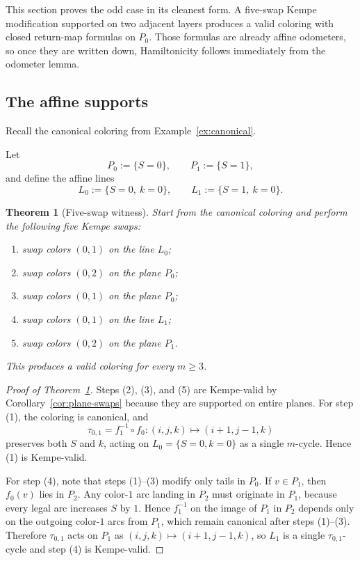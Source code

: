\documentclass[11pt]{article}
\newtheorem{theorem}{Theorem}
\begin{document}
This section proves the odd case in its cleanest form.
A five-swap Kempe modification supported on two adjacent layers produces a valid coloring with closed return-map formulas on $P_0$.
Those formulas are already affine odometers, so once they are written down, Hamiltonicity follows immediately from the odometer lemma.

\subsection{The affine supports}
Recall the canonical coloring from Example~\ref{ex:canonical}.

Let
\[
P_0:=\{S=0\},\qquad P_1:=\{S=1\},
\]
and define the affine lines
\[
L_0:=\{S=0,\ k=0\},\qquad L_1:=\{S=1,\ k=0\}.
\]

\begin{theorem}[Five-swap witness]\label{thm:5swap}
Start from the canonical coloring and perform the following five Kempe swaps:
\begin{enumerate}[leftmargin=2.2em]
\item swap colors $(0,1)$ on the line $L_0$;
\item swap colors $(0,2)$ on the plane $P_0$;
\item swap colors $(0,1)$ on the plane $P_0$;
\item swap colors $(0,1)$ on the line $L_1$;
\item swap colors $(0,2)$ on the plane $P_1$.
\end{enumerate}
This produces a valid coloring for every $m\ge 3$.
\end{theorem}

\begin{proof}[Proof of Theorem~\ref{thm:5swap}]
Steps (2), (3), and (5) are Kempe-valid by Corollary~\ref{cor:plane-swaps} because they are supported on entire planes.
For step (1), the coloring is canonical, and
\[
\tau_{0,1}=f_1^{-1}\circ f_0:(i,j,k)\mapsto(i+1,j-1,k)
\]
preserves both $S$ and $k$, acting on $L_0=\{S=0,k=0\}$ as a single $m$-cycle.
Hence (1) is Kempe-valid.

For step (4), note that steps (1)--(3) modify only tails in $P_0$.
If $v\in P_1$, then $f_0(v)$ lies in $P_2$.
Any color-$1$ arc landing in $P_2$ must originate in $P_1$, because every legal arc increases $S$ by $1$.
Hence $f_1^{-1}$ on the image of $P_1$ in $P_2$ depends only on the outgoing color-$1$ arcs from $P_1$, which remain canonical after steps (1)--(3).
Therefore $\tau_{0,1}$ acts on $P_1$ as $(i,j,k)\mapsto(i+1,j-1,k)$, so $L_1$ is a single $\tau_{0,1}$-cycle and step (4) is Kempe-valid.
\end{proof}
\end{document}
